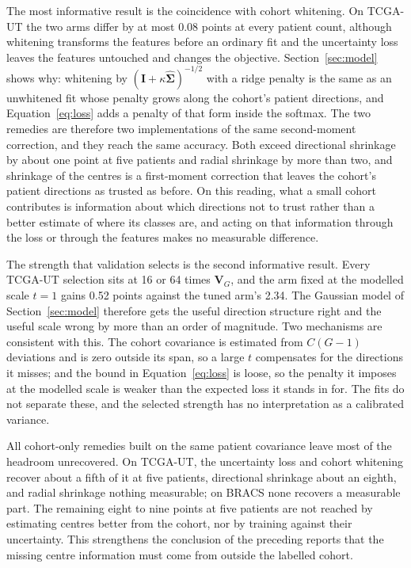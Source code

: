 The most informative result is the coincidence with cohort whitening. On TCGA-UT the two arms differ by at most 0.08 points at every patient count, although whitening transforms the features before an ordinary fit and the uncertainty loss leaves the features untouched and changes the objective. Section~\ref{sec:model} shows why: whitening by $(\mathbf I+\kappa\hat{\boldsymbol\Sigma})^{-1/2}$ with a ridge penalty is the same as an unwhitened fit whose penalty grows along the cohort's patient directions, and Equation~\ref{eq:loss} adds a penalty of that form inside the softmax. The two remedies are therefore two implementations of the same second-moment correction, and they reach the same accuracy. Both exceed directional shrinkage by about one point at five patients and radial shrinkage by more than two, and shrinkage of the centres is a first-moment correction that leaves the cohort's patient directions as trusted as before. On this reading, what a small cohort contributes is information about which directions not to trust rather than a better estimate of where its classes are, and acting on that information through the loss or through the features makes no measurable difference.

The strength that validation selects is the second informative result. Every TCGA-UT selection sits at 16 or 64 times $\mathbf V_G$, and the arm fixed at the modelled scale $t=1$ gains 0.52 points against the tuned arm's 2.34. The Gaussian model of Section~\ref{sec:model} therefore gets the useful direction structure right and the useful scale wrong by more than an order of magnitude. Two mechanisms are consistent with this. The cohort covariance is estimated from $C(G-1)$ deviations and is zero outside its span, so a large $t$ compensates for the directions it misses; and the bound in Equation~\ref{eq:loss} is loose, so the penalty it imposes at the modelled scale is weaker than the expected loss it stands in for. The fits do not separate these, and the selected strength has no interpretation as a calibrated variance.

All cohort-only remedies built on the same patient covariance leave most of the headroom unrecovered. On TCGA-UT, the uncertainty loss and cohort whitening recover about a fifth of it at five patients, directional shrinkage about an eighth, and radial shrinkage nothing measurable; on BRACS none recovers a measurable part. The remaining eight to nine points at five patients are not reached by estimating centres better from the cohort, nor by training against their uncertainty. This strengthens the conclusion of the preceding reports that the missing centre information must come from outside the labelled cohort.

